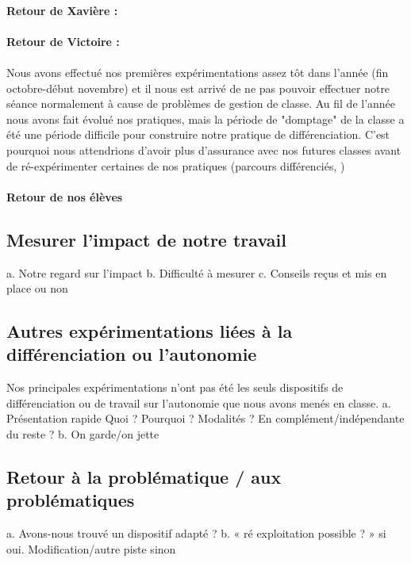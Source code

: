 \paragraph*{Retour de Xavière :}

\paragraph*{Retour de Victoire :}

\paragraph*{}
Nous avons effectué nos premières expérimentations assez tôt dans l'année (fin octobre-début novembre) et il nous est arrivé de ne pas pouvoir effectuer notre séance normalement à cause de problèmes de gestion de classe. Au fil de l'année nous avons fait évolué nos pratiques, mais la période de "domptage"  de la classe a été une période difficile pour construire notre pratique de différenciation. C'est pourquoi nous  attendrions d'avoir plus d'assurance  avec nos futures classes avant de ré-expérimenter certaines de nos pratiques (parcours différenciés, )
\paragraph*{Retour de nos élèves}
\subsection{Mesurer l’impact de notre travail}
a.	Notre regard sur l’impact
b.	Difficulté à mesurer
c.	Conseils reçus et mis en place ou non
\subsection{Autres expérimentations liées à la différenciation ou l’autonomie}
Nos principales expérimentations n'ont pas été les seuls dispositifs de différenciation ou de travail sur l'autonomie que nous avons menés en classe.
a.	Présentation rapide
Quoi ? Pourquoi ? Modalités ? En complément/indépendante du reste ?
b.	On garde/on jette
\subsection{Retour à la problématique / aux problématiques}
a.	Avons-nous trouvé un dispositif adapté ?
b.	« ré exploitation possible ? » si oui. Modification/autre piste sinon 
